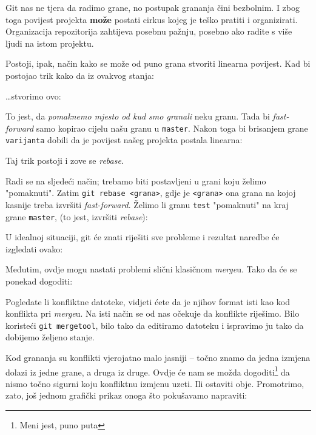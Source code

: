Git nas ne tjera da radimo grane, no postupak grananja čini bezbolnim. 
I zbog toga povijest projekta \textbf{može} postati cirkus kojeg je teško pratiti i organizirati.
Organizacija repozitorija zahtijeva posebnu pažnju, posebno ako radite s više ljudi na istom projektu.

Postoji, ipak, način kako se može od puno grana stvoriti linearna povijest.
Kad bi postojao trik kako da iz ovakvog stanja:



\dots{}stvorimo ovo:



To jest, da \emph{pomaknemo mjesto od kud smo granali} neku granu. 
Tada bi \emph{fast-forward} samo kopirao cijelu našu granu u \verb+master+.
Nakon toga bi brisanjem grane \verb+varijanta+ dobili da je povijest našeg projekta postala linearna:



Taj trik postoji i zove se \emph{rebase}.

Radi se na sljedeći način; trebamo biti postavljeni u grani koju želimo "pomaknuti". Zatim \verb+git rebase <grana>+, gdje je \verb+<grana>+ ona grana na kojoj kasnije treba izvršiti \emph{fast-forward}. 
Želimo li granu \verb+test+ "pomaknuti" na kraj grane \verb+master+, (to jest, izvršiti \emph{rebase}):


U idealnoj situaciji, git će znati riješiti sve probleme i rezultat naredbe će izgledati ovako:



Međutim, ovdje mogu nastati problemi slični klasičnom \emph{merge}u.
Tako da će se ponekad dogoditi:



Pogledate li konfliktne datoteke, vidjeti ćete da je njihov format isti kao kod konflikta pri \emph{merge}u.
Na isti način se od nas očekuje da konflikte riješimo.
Bilo koristeći \verb+git mergetool+, bilo tako da editiramo datoteku i ispravimo ju tako da dobijemo željeno stanje.

Kod grananja su konflikti vjerojatno malo jasniji -- točno znamo da jedna izmjena dolazi iz jedne grane, a druga iz druge.
Ovdje će nam se možda dogoditi\footnote{Meni jest, puno puta} da nismo točno sigurni koju konfliktnu izmjenu uzeti.
Ili ostaviti obje.
Promotrimo, zato, još jednom grafički prikaz onoga što pokušavamo napraviti:

